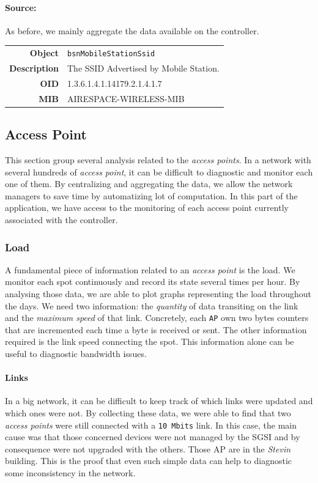 \paragraph*{Source:} As before, we mainly aggregate the data available on the controller.

\begin{tabular}{|r l|}
\hline
\textbf{Object} & \texttt{bsnMobileStationSsid} \\
\textbf{Description} & \parbox{11cm}{The SSID Advertised by Mobile Station.} \\
\textbf{OID} & 1.3.6.1.4.1.14179.2.1.4.1.7 \\
\textbf{MIB} & AIRESPACE-WIRELESS-MIB \\
\hline
\end{tabular}

\subsection{Access Point}
This section group several analysis related to the \emph{access points}. In a network with several hundreds of \emph{access point}, it can be difficult to diagnostic and monitor each one of them. By centralizing and aggregating the data, we allow the network managers to save time by automatizing lot of computation. In this part of the application, we have access to the monitoring of each access point currently associated with the controller.

\subsubsection*{Load}
A fundamental piece of information related to an \emph{access point} is the load. We monitor each spot continuously and record its state several times per hour. By analysing those data, we are able to plot graphs representing the load throughout the days. We need two information: the \textit{quantity} of data transiting on the link and the \textit{maximum speed} of that link. Concretely, each \texttt{AP} own two bytes counters that are incremented each time a byte is received or sent. The other information required is the link speed connecting the spot. This information alone can be useful to diagnostic bandwidth issues. 
\paragraph*{Links} In a big network, it can be difficult to keep track of which links were updated and which ones were not. By collecting these data, we were able to find that two \emph{access points} were still connected with a \texttt{10 Mbits} link. In this case, the main cause was that those concerned devices were not managed by the SGSI and by consequence were not upgraded with the others. Those AP are in the \emph{Stevin} building.
This is the proof that even such simple data can help to diagnostic some inconsistency in the network.

